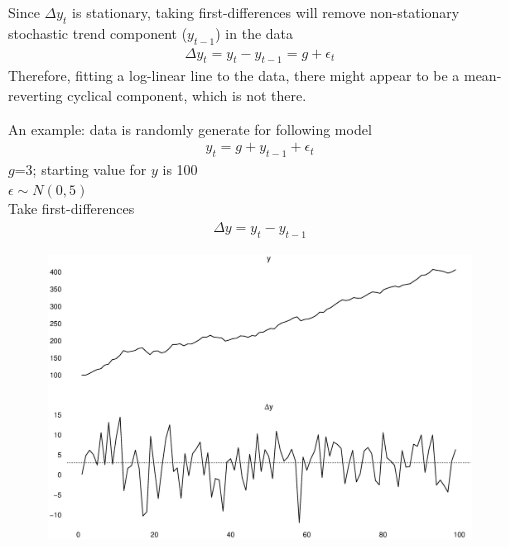 \documentclass{beamer}
\begin{document}
\begin{frame}
  Since $\Delta y_t$ is stationary, taking first-differences will remove non-stationary stochastic trend component ($y_{t-1}$) in the data
  \begin{align}
    \Delta y_t= y_t - y_{t-1}=g+\epsilon_t
  \end{align}
  \medskip
  Therefore, fitting a log-linear line to the data, there might appear to be a mean-reverting cyclical component, which is not there.  
\end{frame}


\begin{frame}
  An example: data is randomly generate for following model
  \begin{align}
    y_t=g+y_{t-1}+\epsilon_t
  \end{align}
  \medskip
  $g$=3; starting value for $y$ is 100\\
  $\epsilon \sim N(0,5)$\\
  Take first-differences
  \begin{align}
    \Delta y = y_t - y_{t-1}
  \end{align}
\end{frame}

\begin{frame}
  \begin{figure}
    \includegraphics[scale=.3]{detrending_issue.eps}
  \end{figure}
\end{frame}
\end{document}
